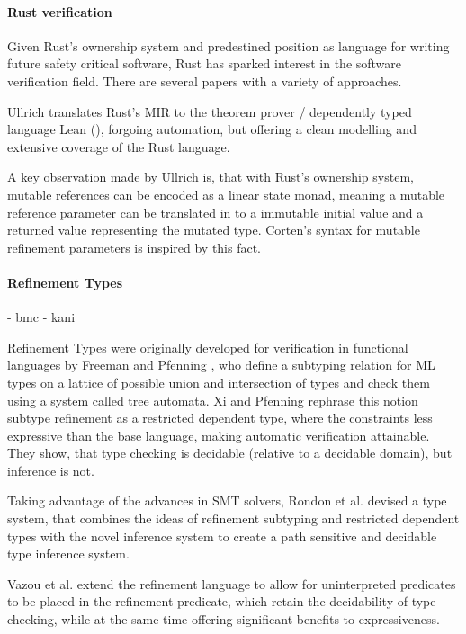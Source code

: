 \documentclass[twoside, english]{sdqthesis}
\theoremstyle{definition}
\begin{document}
\paragraph*{Rust verification}

Given Rust's ownership system and predestined position as language for writing future safety critical software, Rust has sparked interest in the software verification field. There are several papers with a variety of approaches.


Ullrich \cite{ullrich_simple_nodate} translates Rust's MIR to the theorem prover / dependently typed language Lean (\cite{de_moura_lean_2015}), forgoing automation, but offering a clean modelling and extensive coverage of the Rust language.

A key observation made by Ullrich is, that with Rust's ownership system, mutable references can be encoded as a linear state monad, meaning a mutable reference parameter can be translated in to a immutable initial value and a returned value representing the mutated type. Corten's syntax for mutable refinement parameters is inspired by this fact.

\paragraph*{Refinement Types}

- bmc
- kani

Refinement Types were originally developed for verification in functional languages by Freeman and Pfenning \cite{freeman_refinement_1991}, who define a subtyping relation for ML types on a lattice of possible union and intersection of types and check them using a system called tree automata. 
Xi and Pfenning \cite{xi_dependent_1999} rephrase this notion subtype refinement as a restricted dependent type, where the constraints less expressive than the base language, making automatic verification attainable. They show, that type checking is decidable (relative to a decidable domain), but inference is not.

Taking advantage of the advances in SMT solvers, Rondon et al. \cite{rondon_liquid_2008} devised a type system, that combines the ideas of refinement subtyping and restricted dependent types with the novel inference system to create a path sensitive and decidable type inference system.

Vazou et al. \cite{vazou_abstract_2013} extend the refinement language to allow for uninterpreted predicates to be placed in the refinement predicate, which retain the decidability of type checking, while at the same time offering significant benefits to expressiveness. 
\end{document}
